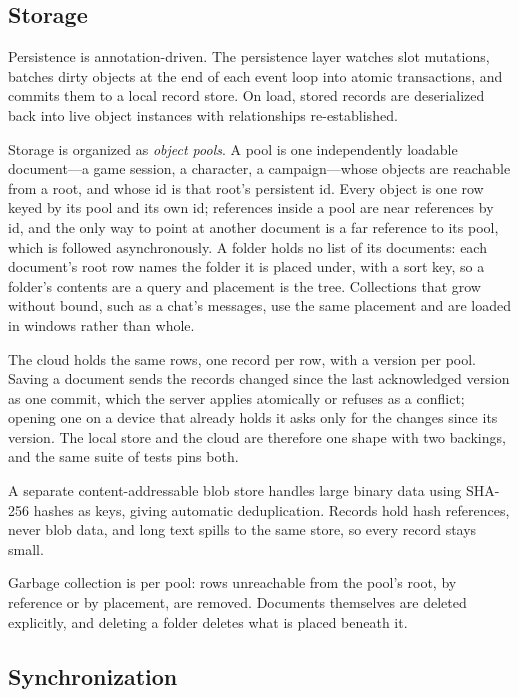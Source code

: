 \documentclass[sigplan,review,anonymous,10pt]{acmart}
\begin{document}
\subsection{Storage}
\label{sec:storage}

Persistence is annotation-driven. The persistence layer watches slot mutations, batches dirty objects at the end of each event loop into atomic transactions, and commits them to a local record store. On load, stored records are deserialized back into live object instances with relationships re-established.

Storage is organized as \emph{object pools}. A pool is one independently loadable document---a game session, a character, a campaign---whose objects are reachable from a root, and whose id is that root's persistent id. Every object is one row keyed by its pool and its own id; references inside a pool are near references by id, and the only way to point at another document is a far reference to its pool, which is followed asynchronously. A folder holds no list of its documents: each document's root row names the folder it is placed under, with a sort key, so a folder's contents are a query and placement is the tree. Collections that grow without bound, such as a chat's messages, use the same placement and are loaded in windows rather than whole.

The cloud holds the same rows, one record per row, with a version per pool. Saving a document sends the records changed since the last acknowledged version as one commit, which the server applies atomically or refuses as a conflict; opening one on a device that already holds it asks only for the changes since its version. The local store and the cloud are therefore one shape with two backings, and the same suite of tests pins both.

A separate content-addressable blob store handles large binary data using SHA-256 hashes as keys, giving automatic deduplication. Records hold hash references, never blob data, and long text spills to the same store, so every record stays small.

Garbage collection is per pool: rows unreachable from the pool's root, by reference or by placement, are removed. Documents themselves are deleted explicitly, and deleting a folder deletes what is placed beneath it.

\subsection{Synchronization}
\end{document}
